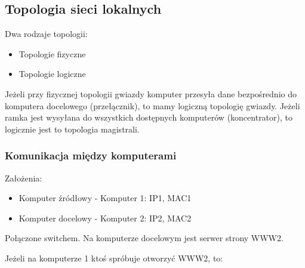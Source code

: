 \documentclass[../main.tex]{subfiles}
\begin{document}
    \subsection{Topologia sieci lokalnych}
    Dwa rodzaje topologii:
    \begin{itemize}
        \item Topologie fizyczne
        \item Topologie logiczne
    \end{itemize}

    Jeżeli przy fizycznej topologii gwiazdy komputer przesyła dane bezpośrednio do komputera docelowego (przełącznik), to mamy logiczną topologię gwiazdy. Jeżeli ramka jest wysyłana do wszystkich dostępnych komputerów (koncentrator), to logicznie jest to topologia magistrali.

    \subsubsection{Komunikacja między komputerami}

    Założenia:
    \begin{itemize}
        \item Komputer źródłowy - Komputer 1: IP1, MAC1
        \item Komputer docelowy - Komputer 2: IP2, MAC2
    \end{itemize}
    Połączone switchem. Na komputerze docelowym  jest serwer strony WWW2.

    Jeżeli na komputerze 1 ktoś spróbuje otworzyć WWW2, to:
\end{document}
